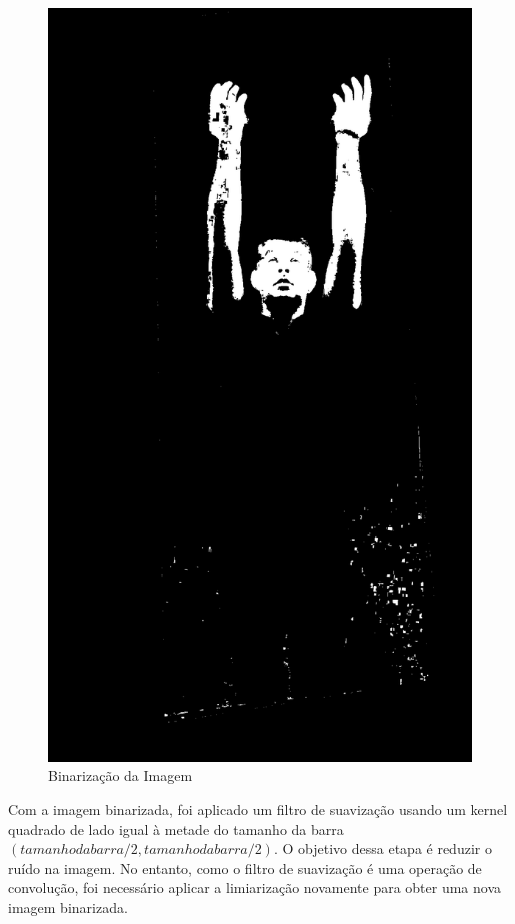 \begin{figure}[!htbp]
\begin{minipage}{\sizeImg\textwidth}
            \includegraphics[width=\textwidth]{figuras/mao_barra/limited.png}
        \end{minipage}
    \caption{Binarização da Imagem}
    \label{fig:gray_limited}
\end{figure}
\newpage

Com a imagem binarizada, foi aplicado um filtro de suavização usando um kernel quadrado de lado igual à metade do tamanho da barra $(tamanho da barra/2, tamanho da barra/2)$. O objetivo dessa etapa é reduzir o ruído na imagem. No entanto, como o filtro de suavização é uma operação de convolução, foi necessário aplicar a limiarização novamente para obter uma nova imagem binarizada.

